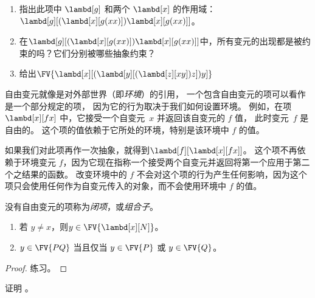 \documentclass[../../../include/open-logic-section]{subfiles}
\begin{document}
\begin{prob}
  \begin{enumerate}
  \item 指出此项中 $\lambd[g]$ 和两个 $\lambd[x]$ 的作用域：$\lambd[g][(\lambd[x][g (x x)]) \lambd[x][g (x x)]]$。
  \item 在$\lambd[g][(\lambd[x][g (x x)]) \lambd[x][g (x x)]]$中，所有变元的出现都是被约束的吗？它们分别被哪些抽象约束？
    \item 给出$\FV{\lambd[x][(\lambd[y][(\lambd[z][x y]) z]) y]}$
  \end{enumerate}
\end{prob}

\begin{explain}
自由变元就像是对外部世界（即\emph{环境}）的引用，
一个包含自由变元的项可以看作是一个部分规定的项，
因为它的行为取决于我们如何设置环境。
例如，在项 $\lambd[x][f x]$ 中，它接受一个自变元~$x$ 并返回该自变元的 $f$ 值，
此时变元~$f$ 是自由的。
这个项的值依赖于它所处的环境，特别是该环境中 $f$ 的值。

如果我们对此项再作一次抽象，就得到$\lambd[f][\lambd[x][f
    x]]$。
这个项不再依赖于环境变元 $f$，因为它现在指称一个接受两个自变元并返回将第一个应用于第二个之结果的函数。
改变环境中的 $f$ 不会对这个项的行为产生任何影响，因为这个项只会使用任何作为自变元传入的对象，而不会使用环境中 $f$ 的值。
\end{explain}

\begin{defn}[闭项，组合子]
  没有自由变元的项称为\emph{闭项}，或\emph{组合子}。
\end{defn}

\begin{lem}
  \begin{enumerate}
    \item {} 若 $y \neq x$，则$y \in
      \FV{\lambd[x][N]}$。
    \item {} $y \in \FV{PQ}$ 当且仅当 $y \in \FV{P}$ 或 $y \in \FV{Q}$。
    \end{enumerate}
\end{lem}

\begin{proof}
  练习。
\end{proof}

\begin{prob}
  证明 。
\end{prob}
\end{document}
